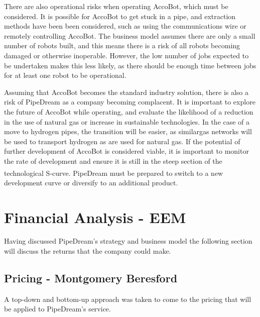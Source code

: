 \documentclass[11pt]{article}		%
\newcommand{\supercite}[1]{\textsuperscript{\cite{#1}}}		%
\begin{document}
     	There are also operational risks when operating AccoBot, which must be considered.
     	It is possible for AccoBot to get stuck in a pipe, and extraction methods have been been considered, such as using the communications wire or remotely controlling AccoBot.
     	The business model assumes there are only a small number of robots built, and this means there is a risk of all robots becoming damaged or otherwise inoperable.
     	However, the low number of jobs expected to be undertaken makes this less likely, as there should be enough time between jobs for at least one robot to be operational.
     	
     	Assuming that AccoBot becomes the standard industry solution, there is also a risk of PipeDream as a company becoming complacent.
     	It is important to explore the future of AccoBot while operating, and evaluate the likelihood of a reduction in the use of natural gas or increase in sustainable technologies.
     	In the case of a move to hydrogen pipes, the transition will be easier, as similargas networks will be used to transport hydrogen as are used for natural gas.
     	If the potential of further development of AccoBot is considered viable, it is important to monitor the rate of development and ensure it is still in the steep section of the technological S-curve\supercite{christensen1998innovation}.
     	PipeDream must be prepared to switch to a new development curve or diversify to an additional product.
     	
 	\section{Financial Analysis - EEM}
 	
 	Having discussed PipeDream's strategy and business model the following section will discuss the  returns that the company could make.
        \subsection[Pricing]{Pricing - Montgomery Beresford} \label{revenue_model}
        
        A top-down and bottom-up approach was taken to come to the pricing that will be applied to PipeDream's service.
        
            
\end{document}
